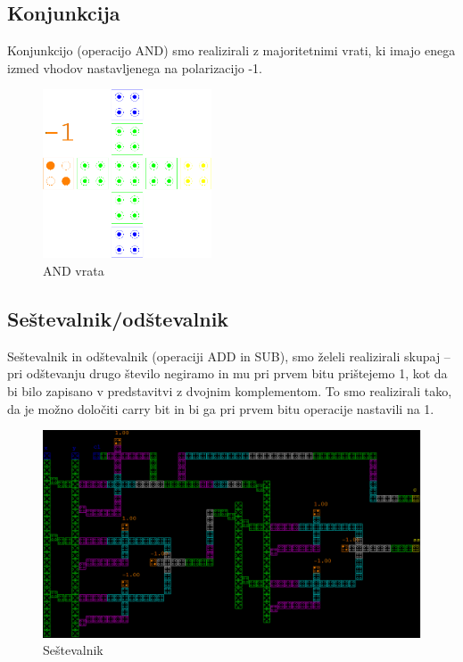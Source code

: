 \documentclass[seminar, slovene]{FRIreport}
\begin{document}
\subsection{Konjunkcija}
Konjunkcijo (operacijo AND) smo realizirali z majoritetnimi vrati, ki imajo enega izmed vhodov nastavljenega na polarizacijo -1.
\begin{figure}[H]
\begin{center}
\includegraphics[width=5cm]{qca/img/AND}
\caption{AND vrata}
\label{AND}
\end{center}
\end{figure}

\subsection{Seštevalnik/odštevalnik}
Seštevalnik in odštevalnik (operaciji ADD in SUB), smo želeli realizirali skupaj -- pri odštevanju drugo število negiramo in mu pri prvem bitu prištejemo 1, kot da bi bilo zapisano v predstavitvi z dvojnim komplementom. To smo realizirali tako, da je možno določiti carry bit in bi ga pri prvem bitu operacije nastavili na 1.

\begin{figure}[H]
\begin{center}
\includegraphics[width=15cm]{qca/img/adder}
\caption{Seštevalnik}
\label{sestevalnikqca}
\end{center}
\end{figure}
\end{document}
